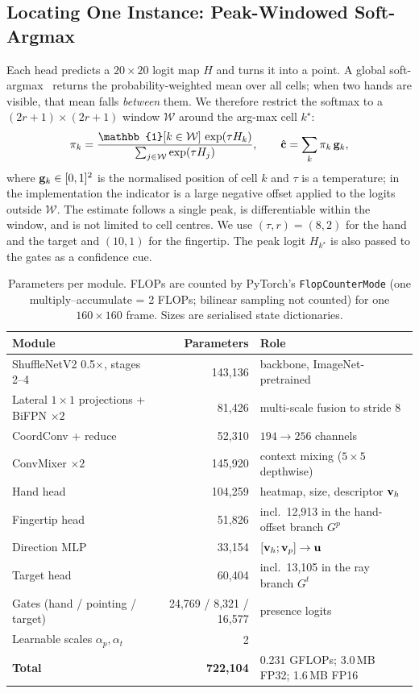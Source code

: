 \subsection{Locating One Instance: Peak-Windowed Soft-Argmax}\label{sec:softargmax}
Each head predicts a $20\times20$ logit map $H$ and turns it into a point. A global soft-argmax~\cite{sun2018integral} returns the probability-weighted mean over all cells; when two hands are visible, that mean falls \emph{between} them. We therefore restrict the softmax to a $(2r{+}1)\times(2r{+}1)$ window $\mathcal{W}$ around the arg-max cell $k^\star$:
\begin{equation}
\pi_k=\frac{\mathbb{1}[k\in\mathcal{W}]\,\exp(\tau H_k)}{\sum_{j\in\mathcal{W}}\exp(\tau H_j)},\qquad
\hat{\vect{c}}=\sum_k \pi_k\,\cell_k ,
\label{eq:softargmax}
\end{equation}
where $\mathbf{g}_k\in[0,1]^2$ is the normalised position of cell $k$ and $\tau$ is a temperature; in the implementation the indicator is a large negative offset applied to the logits outside $\mathcal{W}$. The estimate follows a single peak, is differentiable within the window, and is not limited to cell centres. We use $(\tau,r)=(8,2)$ for the hand and the target and $(10,1)$ for the fingertip. The peak logit $H_{k^\star}$ is also passed to the gates as a confidence cue.

\begin{table}[t]
  \caption{Parameters per module. FLOPs are counted by PyTorch's \texttt{FlopCounterMode} (one multiply--accumulate = 2 FLOPs; bilinear sampling not counted) for one $160\times160$ frame. Sizes are serialised state dictionaries.}
  \label{tab:params}
  \small
  \begin{tabular}{lrl}
    \toprule
    Module & Parameters & Role \\
    \midrule
    ShuffleNetV2 0.5$\times$, stages 2--4 & 143,136 & backbone, ImageNet-pretrained \\
    Lateral $1\times1$ projections + BiFPN $\times2$ & 81,426 & multi-scale fusion to stride 8 \\
    CoordConv + reduce & 52,310 & $194\to256$ channels \\
    ConvMixer $\times2$ & 145,920 & context mixing ($5\times5$ depthwise) \\
    \midrule
    Hand head & 104,259 & heatmap, size, descriptor $\mathbf{v}_h$ \\
    Fingertip head & 51,826 & incl.\ 12,913 in the hand-offset branch $G^p$ \\
    Direction MLP & 33,154 & $[\mathbf{v}_h;\mathbf{v}_p]\to\mathbf{u}$ \\
    Target head & 60,404 & incl.\ 13,105 in the ray branch $G^t$ \\
    Gates (hand / pointing / target) & 24,769 / 8,321 / 16,577 & presence logits \\
    Learnable scales $\alpha_p,\alpha_t$ & 2 & \\
    \midrule
    \textbf{Total} & \textbf{722,104} & 0.231 GFLOPs; 3.0\,MB FP32; 1.6\,MB FP16 \\
    \bottomrule
  \end{tabular}
\end{table}

